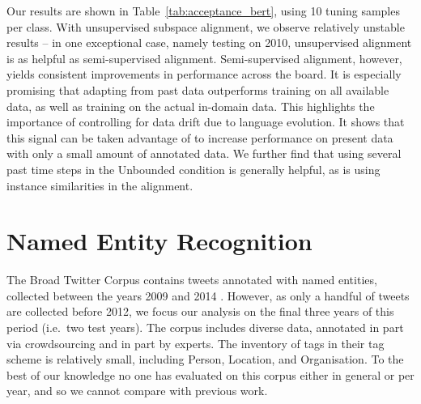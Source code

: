 \documentclass[letterpaper]{article} %
\begin{document}
Our results are shown in Table~\ref{tab:acceptance_bert}, using 10 tuning samples per class.
With unsupervised subspace alignment, we observe relatively unstable results -- in one exceptional case, namely testing on 2010, unsupervised alignment is as helpful as semi-supervised alignment.
Semi-supervised alignment, however, yields consistent improvements in performance across the board.
It is especially promising that adapting from past data outperforms training on all available data, as well as training on the actual in-domain data.
This highlights the importance of controlling for data drift due to language evolution. It shows that this signal can be taken advantage of to increase performance on present data with only a small amount of annotated data.
We further find that using several past time steps in the Unbounded condition is generally helpful, as is using instance similarities in the alignment.

\section{Named Entity Recognition}

\begin{table}[!t]
    \centering
{}
    \caption{NER (F1 score) on the Broad Twitter Corpus \cite{derczynski:2016}.}
    \label{tab:NER}
\end{table}

The Broad Twitter Corpus contains tweets annotated with named entities, collected between the years 2009 and 2014 \cite{derczynski:2016}.
However, as only a handful of tweets are collected before 2012, we focus our analysis on the final three years of this period (i.e.~two test years).
The corpus includes diverse data, annotated in part via crowdsourcing and in part by experts.
The inventory of tags in their tag scheme is relatively small, including Person, Location, and Organisation.
To the best of our knowledge no one has evaluated on this corpus either in general or per year, and so we cannot compare with previous work.
\end{document}
